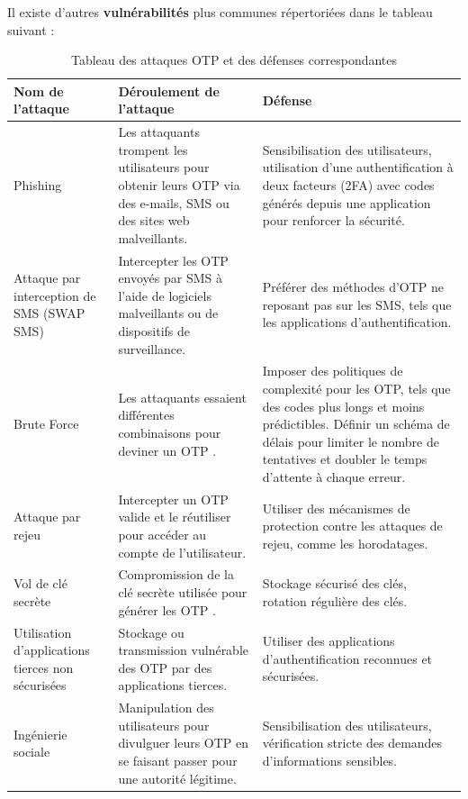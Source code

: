 \documentclass[a4paper, 10pt]{article}
\newcommand{\otp}{\textsc{OTP} }
\begin{document}
\noindent
Il existe d'autres \textcolor{myblue}{\textbf{vulnérabilités}} plus communes répertoriées dans le tableau suivant :


\begin{table}[H]
\centering
\begin{tabular}{| p{2cm} | p{6cm} | p{8cm} |}
\hline
\textbf{Nom de l'attaque} & \textbf{Déroulement de l'attaque} & \textbf{Défense} \\
\hline
Phishing & Les attaquants trompent les utilisateurs pour obtenir leurs \otp via des e-mails, SMS ou des sites web malveillants. & Sensibilisation des utilisateurs, utilisation d'une authentification à deux facteurs (2FA) avec codes générés depuis une application pour renforcer la sécurité. \\
\hline
Attaque par interception de SMS (SWAP SMS) & Intercepter les \otp envoyés par SMS à l'aide de logiciels malveillants ou de dispositifs de surveillance. & Préférer des méthodes d'\otp ne reposant pas sur les SMS, tels que les applications d'authentification. \\
\hline
Brute Force & Les attaquants essaient différentes combinaisons pour deviner un \otp. & Imposer des politiques de complexité pour les OTP, tels que des codes plus longs et moins prédictibles. Définir un schéma de délais pour limiter le nombre de tentatives et doubler le temps d'attente à chaque erreur. \\
\hline
Attaque par rejeu & Intercepter un \otp valide et le réutiliser pour accéder au compte de l'utilisateur. & Utiliser des mécanismes de protection contre les attaques de rejeu, comme les horodatages. \\
\hline
Vol de clé secrète & Compromission de la clé secrète utilisée pour générer les \otp. & Stockage sécurisé des clés, rotation régulière des clés. \\
\hline
Utilisation d'applications tierces non sécurisées & Stockage ou transmission vulnérable des \otp par des applications tierces. & Utiliser des applications d'authentification reconnues et sécurisées. \\
\hline
Ingénierie sociale & Manipulation des utilisateurs pour divulguer leurs \otp en se faisant passer pour une autorité légitime. & Sensibilisation des utilisateurs, vérification stricte des demandes d'informations sensibles. \\
\hline
\end{tabular}
\caption{Tableau des attaques \otp et des défenses correspondantes}
\label{tab:otp_attacks_defenses}
\end{table}
\end{document}
